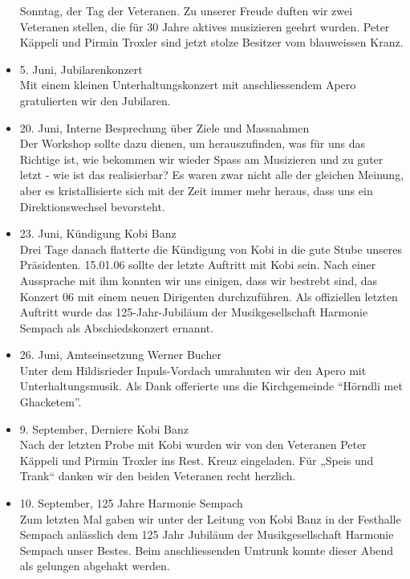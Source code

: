 \begin{history}
\begin{itemize}
        Sonntag, der Tag der Veteranen. Zu unserer Freude duften wir zwei
        Veteranen stellen, die für 30 Jahre aktives musizieren geehrt wurden.
        Peter Käppeli und Pirmin Troxler sind jetzt stolze Besitzer vom
        blauweissen Kranz.

        \item[]5. Juni, Jubilarenkonzert\\
        Mit einem kleinen Unterhaltungskonzert mit anschliessendem Apero
        gratulierten wir den Jubilaren.

        \item[]20. Juni, Interne Besprechung über Ziele und Massnahmen\\
        Der Workshop sollte dazu dienen, um herauszufinden, was für uns das
        Richtige ist, wie bekommen wir wieder Spass am Musizieren und zu guter
        letzt - wie ist das realisierbar? Es waren zwar nicht alle der gleichen
        Meinung, aber es kristallisierte sich mit der Zeit immer mehr heraus,
        dass uns ein Direktionswechsel bevorsteht.

        \item[]23. Juni, Kündigung Kobi Banz\\
        Drei Tage danach flatterte die Kündigung von Kobi in die gute Stube
        unseres Präsidenten. 15.01.06 sollte der letzte Auftritt mit Kobi sein.
        Nach einer Aussprache mit ihm konnten wir uns einigen, dass wir bestrebt
        sind, das Konzert 06 mit einem neuen Dirigenten durchzuführen. Als
        offiziellen letzten Auftritt wurde das 125-Jahr-Jubiläum der
        Musikgesellschaft Harmonie Sempach als Abschiedskonzert ernannt.

        \item[]26. Juni, Amtseinsetzung Werner Bucher\\
        Unter dem Hildisrieder Inpuls-Vordach umrahmten wir den Apero mit
        Unterhaltungsmusik. Als Dank offerierte uns die Kirchgemeinde \enquote{Hörndli
            met Ghacketem}.

        \item[]9. September, Derniere Kobi Banz\\
        Nach der letzten Probe mit Kobi wurden wir von den Veteranen Peter
        Käppeli und Pirmin Troxler ins Rest. Kreuz eingeladen. Für „Speis und Trank“
        danken wir den beiden Veteranen recht herzlich.

        \item[]10. September, 125 Jahre Harmonie Sempach\\
        Zum letzten Mal gaben wir unter der Leitung von Kobi Banz in der
        Festhalle Sempach anlässlich dem 125 Jahr Jubiläum der Musikgesellschaft Harmonie Sempach
        unser Bestes. Beim anschliessenden Umtrunk konnte dieser Abend als
        gelungen abgehakt werden.


\end{itemize}
\end{history}
